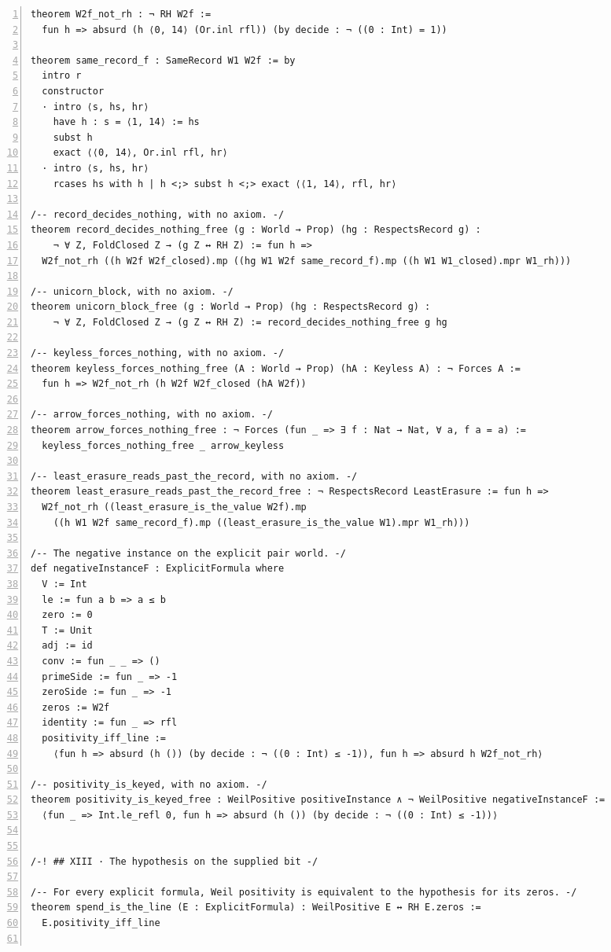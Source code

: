 \documentclass[10pt]{article}
\newcommand{\leansize}{\fontsize{5.5pt}{6.75pt}\selectfont}
\begin{document}
\begin{multicols}{2}
\begin{Verbatim}[numbers=left,firstnumber=1,numbersep=3pt,xleftmargin=2.6em,breaklines=true,breakanywhere=true,breakautoindent=false,breakindent=1.4em,breaksymbolleft={},breakanywheresymbolpre={},fontsize=\leansize]
theorem W2f_not_rh : ¬ RH W2f :=
  fun h => absurd (h ⟨0, 14⟩ (Or.inl rfl)) (by decide : ¬ ((0 : Int) = 1))

theorem same_record_f : SameRecord W1 W2f := by
  intro r
  constructor
  · intro ⟨s, hs, hr⟩
    have h : s = ⟨1, 14⟩ := hs
    subst h
    exact ⟨⟨0, 14⟩, Or.inl rfl, hr⟩
  · intro ⟨s, hs, hr⟩
    rcases hs with h | h <;> subst h <;> exact ⟨⟨1, 14⟩, rfl, hr⟩

/-- record_decides_nothing, with no axiom. -/
theorem record_decides_nothing_free (g : World → Prop) (hg : RespectsRecord g) :
    ¬ ∀ Z, FoldClosed Z → (g Z ↔ RH Z) := fun h =>
  W2f_not_rh ((h W2f W2f_closed).mp ((hg W1 W2f same_record_f).mp ((h W1 W1_closed).mpr W1_rh)))

/-- unicorn_block, with no axiom. -/
theorem unicorn_block_free (g : World → Prop) (hg : RespectsRecord g) :
    ¬ ∀ Z, FoldClosed Z → (g Z ↔ RH Z) := record_decides_nothing_free g hg

/-- keyless_forces_nothing, with no axiom. -/
theorem keyless_forces_nothing_free (A : World → Prop) (hA : Keyless A) : ¬ Forces A :=
  fun h => W2f_not_rh (h W2f W2f_closed (hA W2f))

/-- arrow_forces_nothing, with no axiom. -/
theorem arrow_forces_nothing_free : ¬ Forces (fun _ => ∃ f : Nat → Nat, ∀ a, f a = a) :=
  keyless_forces_nothing_free _ arrow_keyless

/-- least_erasure_reads_past_the_record, with no axiom. -/
theorem least_erasure_reads_past_the_record_free : ¬ RespectsRecord LeastErasure := fun h =>
  W2f_not_rh ((least_erasure_is_the_value W2f).mp
    ((h W1 W2f same_record_f).mp ((least_erasure_is_the_value W1).mpr W1_rh)))

/-- The negative instance on the explicit pair world. -/
def negativeInstanceF : ExplicitFormula where
  V := Int
  le := fun a b => a ≤ b
  zero := 0
  T := Unit
  adj := id
  conv := fun _ _ => ()
  primeSide := fun _ => -1
  zeroSide := fun _ => -1
  zeros := W2f
  identity := fun _ => rfl
  positivity_iff_line :=
    ⟨fun h => absurd (h ()) (by decide : ¬ ((0 : Int) ≤ -1)), fun h => absurd h W2f_not_rh⟩

/-- positivity_is_keyed, with no axiom. -/
theorem positivity_is_keyed_free : WeilPositive positiveInstance ∧ ¬ WeilPositive negativeInstanceF :=
  ⟨fun _ => Int.le_refl 0, fun h => absurd (h ()) (by decide : ¬ ((0 : Int) ≤ -1))⟩


/-! ## XIII · The hypothesis on the supplied bit -/

/-- For every explicit formula, Weil positivity is equivalent to the hypothesis for its zeros. -/
theorem spend_is_the_line (E : ExplicitFormula) : WeilPositive E ↔ RH E.zeros :=
  E.positivity_iff_line


\end{Verbatim}
\end{multicols}
\end{document}
